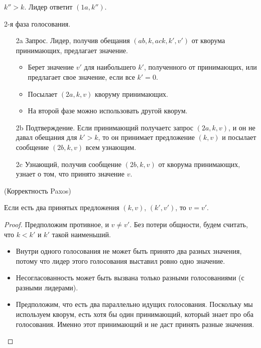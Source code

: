 \begin{algorithm}
\begin{itemize}
\begin{itemize}
                    $k'' > k$. Лидер ответит $(1a, k'')$.
            \end{itemize}
    \end{itemize}
    2-я фаза голосования.
    \begin{itemize}
        \item[2a] Запрос. Лидер, получив обещания $(ab, k, ack, k', v')$ от
            кворума принимающих, предлагает значение.
            \begin{itemize}
                \item Берет значение $v'$ для наибольшего $k'$, полученного
                    от принимающих, или предлагает свое значение, если 
                    все $k' = 0$.
                \item Посылает $(2a, k, v)$ кворуму принимающих.
                \item На второй фазе можно использовать другой кворум.
            \end{itemize}
        \item[2b] Подтверждение. Если принимающий получаетс запрос $(2a, k, v)$,
            и он не давал обещания для $k' > k$, то он принимает предложение $(k, v)$
            и посылает сообщение $(2b, k, v)$ всем узнающим.
        \item[2c] Узнающий, получив сообщение $(2b, k, v)$ от кворума принимающих,
            узнает о том, что принято значение $v$.
    \end{itemize}
\end{algorithm}

\begin{theorem}(Корректность Paxos)

    Если есть два принятых предложения $(k, v)$, $(k', v')$, то $v = v'$.
\end{theorem}
\begin{proof}
    Предположим противное, и $v \neq v'$. Без потери общности, будем считать, что
    $k < k'$ и $k'$ такой наименьший.
    \begin{itemize}
        \item Внутри одного голосования не может быть принято два разных значения,
            потому что лидер этого голосования выставил ровно одно значение.
        \item Несогласованность может быть вызвана только разными голосованиями
            (с разными лидерами).
        \item Предположим, что есть два параллельно идущих голосования. Поскольку 
            мы используем кворум, есть хотя бы один принимающий, который 
            знает про оба голосования. Именно этот принимающий и не даст
            принять разные значения.
    \end{itemize}
\end{proof}


